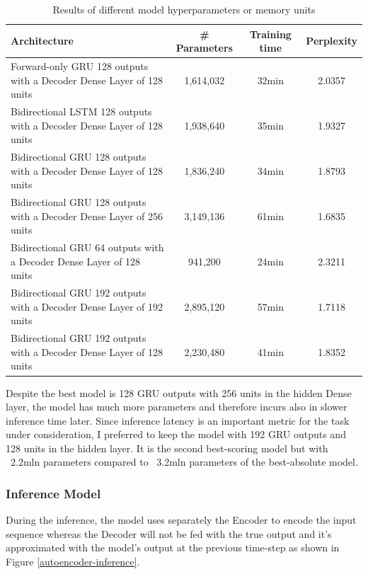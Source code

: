 \documentclass{article}
\begin{document}
\begin{table}[!htbp]
   \centering
   \begin{tabular}{lccc}
     \toprule
     Architecture & \# Parameters & Training time & Perplexity \\
     \midrule
     Forward-only GRU 128 outputs with a Decoder Dense Layer of 128 units  & 1,614,032 & 32min & 2.0357 \\
     Bidirectional LSTM 128 outputs with a Decoder Dense Layer of 128 units & 1,938,640 & 35min & 1.9327 \\
     Bidirectional GRU 128 outputs with a Decoder Dense Layer of 128 units & 1,836,240 & 34min & 1.8793 \\
     Bidirectional GRU 128 outputs with a Decoder Dense Layer of 256 units & 3,149,136 & 61min & 1.6835 \\
     Bidirectional GRU 64 outputs with a Decoder Dense Layer of 128 units & 941,200 & 24min & 2.3211 \\
     Bidirectional GRU 192 outputs with a Decoder Dense Layer of 192 units & 2,895,120 & 57min & 1.7118 \\
     Bidirectional GRU 192 outputs with a Decoder Dense Layer of 128 units & 2,230,480 & 41min & 1.8352 \\
     \bottomrule
   \end{tabular}
   \caption{Results of different model hyperparameters or memory units}
   \label{tab:hyperparameters}
\end{table}

Despite the best model is 128 GRU outputs with 256 units in the hidden Dense layer, the model has much more parameters and therefore incurs also in slower inference time later. Since inference latency is an important metric for the task under consideration, I preferred to keep the model with 192 GRU outputs and 128 units in the hidden layer. It is the second best-scoring model but with ~2.2mln parameters compared to ~3.2mln parameters of the best-absolute model.

\subsubsection{Inference Model}\label{inference-model}

During the inference, the model uses separately the Encoder to encode the input sequence whereas the Decoder will not be fed with the true output and it's approximated with the model's output at the previous time-step as shown in Figure \ref{autoencoder-inference}.
\end{document}
